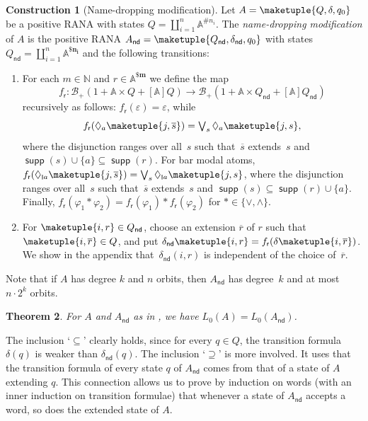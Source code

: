\documentclass[10pt,a4paper]{amsart}
\newtheorem{theo}{Theorem}[section]
\theoremstyle{definition}
\newtheorem{construction}[theo]{Construction}
\newcommand{\seq}{\subseteq}
\newcommand{\qes}{\supseteq}
\newcommand{\At}{\mathds{A}}
\newcommand{\op}[1]{\operatorname{\mathsf{#1}}}
\newcommand{\nd}{\op{nd}}
\newcommand{\allbool}{\mathcal{B}}
\newcommand{\posbool}{\allbool_+}
\DeclareMathOperator{\supp}{\mathsf{supp}}
\newcommand{\names}{\At}
\newcommand{\Abstr}[2][\names]{[#1]#2}
\newcommand{\parnom}[1]{\names^{\$\mathbf{#1}}}
\newcommand{\set}[1]{\{#1\}}
\newcommand{\Nat}{\mathds{N}}
\newcommand{\scriptmidmid}{\hspace{0.2ex}{\rule[-0.1ex]{0.6pt}{1.1ex}}\hspace{0.2ex}}
\newcommand{\scriptnew}[1]{{\scriptmidmid}#1}
\renewcommand{\enquote}[1]{`#1'}
\begin{document}
\begin{construction}[Name-dropping modification]\label{constr:name-dropping}
  Let $A = \maketuple{Q, \delta, q_0}$ be a positive RANA 
  with states $Q = \coprod_{i=1}^n \names^{\# n_i}$. The
  \emph{name-dropping modification} of $A$ is the positive RANA $A_{\nd} = \maketuple{Q_{\nd},
  \delta_{\nd}, q_0}$ with states $Q_{\nd} = \coprod_{i=1}^n \parnom{n_i}$ and the following transitions:
  \begin{enumerate}
    \item For each $m\in \Nat$ and $r\in \parnom{m}$ we define the map
      \[f_{\mathsf{r}}\colon \posbool(1 + \names \times Q + \Abstr{Q}) \to
      \posbool(1 + \names \times Q_{\nd} + \Abstr{Q_{\nd}})\]
      recursively as follows: $f_{\mathsf{r}}(\varepsilon) = \varepsilon$, while
      \[\textstyle  f_\mathsf{r}(\Diamond_a \maketuple{j, \overline{s}}) = \bigvee_{s}
      \Diamond_a \maketuple{j, s},\] where the disjunction ranges over
      all~$s$ such that~$\overline{s}$ extends~$s$ and
      $\supp(s) \cup \set{a} \seq \supp(r)$.
      For bar modal atoms,
      $f_{\mathsf{r}}(\Diamond_{\scriptnew{a}} \maketuple{j, \overline{s}}) =
      \bigvee_s \Diamond_{\scriptnew{a}} \maketuple{j, s}$, where the
      disjunction ranges over all~$s$ such that~$\overline{s}$
      extends~$s$ and $\supp(s) \seq \supp(r) \cup \set{a}$.  Finally,
      $f_{\mathsf{r}}(\varphi_1 \ast \varphi_2) = f_{\mathsf{r}}(\varphi_1) \ast
      f_{\mathsf{r}}(\varphi_2)$ for $\ast \in \set{\vee, \wedge}$.
\item For $\maketuple{i, r} \in Q_{\nd}$, choose an extension $\overline{r}$
      of $r$ such that
      $\maketuple{i, \overline{r}} \in Q$, and put
      $\delta_{\nd}\maketuple{i,r}=f_{\mathsf{r}}(\delta\maketuple{i,\overline{r}})$. We show in
      the appendix that~$\delta_{\nd}(i,r)$ is
      independent of the choice of~$\overline{r}$.
  \end{enumerate} 
Note that if $A$ has degree $k$ and $n$ orbits, then $A_{\nd}$ has degree~$k$ and
  at most $n \cdot 2^k$ orbits.
\end{construction}


\begin{theo}\label{thm:relAAnd}
For $A$ and $A_{\nd}$ as in , we have $L_0(A)=L_0(A_{\nd})$.
\end{theo}
\begin{IEEEproof}
  The inclusion \enquote{$\seq$} clearly holds, since for every $q\in Q$, the transition formula $\delta(q)$ is weaker than $\delta_{\nd}(q)$.
  The inclusion \enquote{$\qes$} is more involved. It uses that the transition formula
  of every state $q$ of $A_{\nd}$ comes from that of a state of $A$ extending $q$. This connection allows us to prove by  induction on words (with an inner induction on transition formulae) that whenever a state of $A_{\nd}$ accepts a word, so does the extended state of $A$.
\end{IEEEproof}
\end{document}
